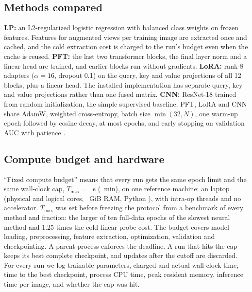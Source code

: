 \documentclass[conference,a4paper]{IEEEtran}
\begin{document}
\subsection{Methods compared}

\textbf{LP:} an L2-regularized logistic regression with balanced class weights
on frozen features. Features for \valProtocolLpViews augmented views per
training image are extracted once and cached, and the cold extraction cost is
charged to the run's budget even when the cache is reused. \textbf{PFT:} the
last two transformer blocks, the final layer norm and a linear head are trained,
and earlier blocks run without gradients. \textbf{LoRA:} rank-8 adapters
($\alpha = 16$, dropout 0.1) on the query, key and value projections of all 12
blocks, plus a linear head. The installed implementation has separate query, key
and value projections rather than one fused matrix. \textbf{CNN:} ResNet-18
\cite{he2015resnet} trained from random initialization, the simple supervised
baseline. PFT, LoRA and CNN share AdamW, weighted cross-entropy, batch size
$\min(32, N)$, one warm-up epoch followed by cosine decay, at most
\valProtocolMaxEpochs epochs, and early stopping on validation AUC with patience
\valProtocolPatience.

\subsection{Compute budget and hardware}

``Fixed compute budget'' means that every run gets the same epoch limit and the
same wall-clock cap, $T_{\max}$ = \valProtocolCapSeconds~s
(\valProtocolCapMinutes~min), on one reference machine: an \valHwCpu laptop
(\valHwPhysicalCores physical and \valHwLogicalCores logical cores,
\valHwRamGib~GiB RAM, Python \valHwPython), with \valProtocolThreads intra-op
threads and no accelerator. $T_{\max}$ was set before freezing the protocol from
a benchmark of every method and fraction: the larger of ten full-data epochs of
the slowest neural method and 1.25 times the cold linear-probe cost. The budget
covers model loading, preprocessing, feature extraction, optimization,
validation and checkpointing. A parent process enforces the deadline. A run that
hits the cap keeps its best complete checkpoint, and updates after the cutoff
are discarded. For every run we log trainable parameters, charged and actual
wall-clock time, time to the best checkpoint, process CPU time, peak resident
memory, inference time per image, and whether the cap was hit.
\end{document}
